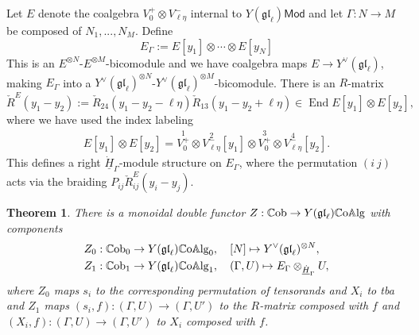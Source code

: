 \documentclass[11pt]{report}
\newtheorem{theorem}{Theorem}[section]
\theoremstyle{definition}
\theoremstyle{remark}
\theoremstyle{remark}
\begin{document}
Let $E$ denote the coalgebra $V_0^+ \otimes V_{\ell\eta}^-$ internal to $Y(\mathfrak{gl}_\ell)\mathsf{Mod}$ and let $\Gamma: N \to M$ be composed of $N_1,...,N_M$. Define
\begin{equation*}
E_\Gamma := E[y_1] \otimes \cdots \otimes E[y_N]
\end{equation*}
This is an $E^{\otimes N}$-$E^{\otimes M}$-bicomodule and we have coalgebra maps $E \to Y^\vee(\mathfrak{gl}_\ell)$, making $E_\Gamma$ into a $Y^\vee(\mathfrak{gl}_\ell)^{\otimes N}$-$Y^\vee(\mathfrak{gl}_\ell)^{\otimes M}$-bicomodule. There is an $R$-matrix
\begin{equation*}
\check R^E(y_1-y_2) := \check R_{24}(y_1-y_2-\ell\eta) \check R_{13}(y_1-y_2+\ell\eta) \in \operatorname{End} E[y_1] \otimes E[y_2],
\end{equation*}
where we have used the index labeling
\begin{align*}
E[y_1] \otimes E[y_2]
= \overset{1}{V_0^+} \otimes \overset{2}{V_{\ell\eta}^-}[y_1] \otimes \overset{3}{V_0^+} \otimes \overset{4}{V_{\ell\eta}^-}[y_2].
\end{align*}
This defines a right $\underline{\dot H}_\Gamma$-module structure on $E_\Gamma$, where the permutation $(i \ j)$ acts via the braiding $P_{ij} \check R_{ij}^E(y_i-y_j)$.

\begin{theorem}
There is a monoidal double functor $Z: \mathbb{C}\textnormal{ob} \to Y(\mathfrak{gl}_\ell)\mathbb{C}\textnormal{o}\mathbb{A}\textnormal{lg}$ with components
\begin{align*}
Z_0&: \mathbb{C}\textnormal{ob}_0 \to Y(\mathfrak{gl}_\ell)\mathbb{C}\textnormal{o}\mathbb{A}\textnormal{lg}_0, \quad [N] \mapsto Y^\vee(\mathfrak{gl}_\ell)^{\otimes N}, \\
Z_1&: \mathbb{C}\textnormal{ob}_1 \to Y(\mathfrak{gl}_\ell)\mathbb{C}\textnormal{o}\mathbb{A}\textnormal{lg}_1, \quad (\Gamma,U) \mapsto E_\Gamma \otimes_{\underline{\dot H}_\Gamma} U,
\end{align*}
where $Z_0$ maps $s_i$ to the corresponding permutation of tensorands and $X_i$ to tba and $Z_1$ maps $(s_i,f): (\Gamma,U) \to (\Gamma,U')$ to the $R$-matrix composed with $f$ and $(X_i,f): (\Gamma,U) \to (\Gamma,U')$ to $X_i$ composed with $f$.
\end{theorem}
\end{document}
